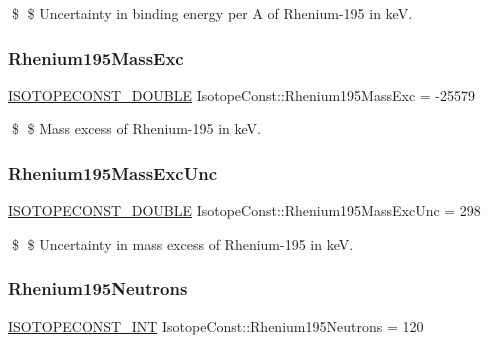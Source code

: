 \$ \$ Uncertainty in binding energy per A of Rhenium-\/195 in keV. \mbox{\label{group___isotope_const-_rhenium-_re195_ga9b0f607ce1008e84d2b2460aec54c277}} 
\subsubsection{\texorpdfstring{Rhenium195\+Mass\+Exc}{Rhenium195MassExc}}
{\footnotesize\ttfamily \mbox{\hyperlink{group___isotope_const-_macros_ga8f45a7272ce02c0b4c65c44636ed719a}{I\+S\+O\+T\+O\+P\+E\+C\+O\+N\+S\+T\+\_\+\+D\+O\+U\+B\+LE}} Isotope\+Const\+::\+Rhenium195\+Mass\+Exc = -\/25579}

\$ \$ Mass excess of Rhenium-\/195 in keV. \mbox{\label{group___isotope_const-_rhenium-_re195_ga9f1119ddbf8894386bb37c77f35f6685}} 
\subsubsection{\texorpdfstring{Rhenium195\+Mass\+Exc\+Unc}{Rhenium195MassExcUnc}}
{\footnotesize\ttfamily \mbox{\hyperlink{group___isotope_const-_macros_ga8f45a7272ce02c0b4c65c44636ed719a}{I\+S\+O\+T\+O\+P\+E\+C\+O\+N\+S\+T\+\_\+\+D\+O\+U\+B\+LE}} Isotope\+Const\+::\+Rhenium195\+Mass\+Exc\+Unc = 298}

\$ \$ Uncertainty in mass excess of Rhenium-\/195 in keV. \mbox{\label{group___isotope_const-_rhenium-_re195_ga8e0aac0002d121927f0d6770e9f8fdb1}} 
\subsubsection{\texorpdfstring{Rhenium195\+Neutrons}{Rhenium195Neutrons}}
{\footnotesize\ttfamily \mbox{\hyperlink{group___isotope_const-_macros_ga5f18360b3e99483a35c32d789e62621c}{I\+S\+O\+T\+O\+P\+E\+C\+O\+N\+S\+T\+\_\+\+I\+NT}} Isotope\+Const\+::\+Rhenium195\+Neutrons = 120}

